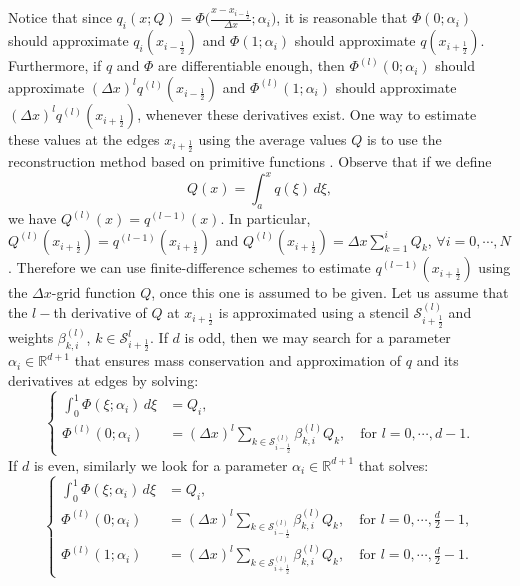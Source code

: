 Notice that since $q_i(x;Q) = \Phi\big(\frac{x-x_{i-\frac{1}{2}}}{\Delta x};\alpha_i\big)$, 
it is reasonable that $\Phi(0;\alpha_i)$ should approximate $q_i(x_{i-\frac{1}{2}})$ and $\Phi(1;\alpha_i)$ should approximate $q(x_{i+\frac{1}{2}})$.
Furthermore, if $q$ and $\Phi$ are differentiable enough, then 
$\Phi^{(l)}(0;\alpha_i)$ should approximate $(\Delta x)^l q^{(l)}(x_{i-\frac{1}{2}})$ and $\Phi^{(l)}(1;\alpha_i)$ should approximate
$(\Delta x)^l q^{(l)}(x_{i+\frac{1}{2}})$, whenever these derivatives exist.
One way to estimate these values at the edges $x_{i+\frac{1}{2}}$ using the average values $Q$ is to use the reconstruction method
based on primitive functions \citep[Chapter~17]{leveque:2002}.
Observe that if we define 
\begin{equation}
\label{chp2-sec-recon-ppm-eq5}
Q(x) = \int_{a}^x q(\xi) \,d\xi,
\end{equation}
we have $Q^{(l)}(x) = q^{(l-1)}(x)$. In particular, $Q^{(l)}(x_{i+\frac{1}{2}}) = q^{(l-1)}(x_{i+\frac{1}{2}})$ and
$Q^{(l)}(x_{i+\frac{1}{2}}) = \Delta x\sum_{k=1}^i Q_k$, $\forall i=0, \cdots, N$.
Therefore we can use finite-difference schemes to estimate $q^{(l-1)}(x_{i+\frac{1}{2}})$
using the $\Delta x$-grid function $Q$, once this one is assumed to be given.
Let us assume that the $l-$th derivative of $Q$ at $x_{i+\frac{1}{2}}$ is approximated using
a stencil $\mathcal{S}^{(l)}_{i+\frac{1}{2}}$ and weights $\beta^{(l)}_{k,i}$, $k \in \mathcal{S}^l_{i+\frac{1}{2}}$.
If $d$ is odd, then we may search for a parameter $\alpha_i \in \mathbb{R}^{d+1}$ that ensures mass conservation and approximation of 
$q$ and its derivatives at edges by solving:
\begin{equation}
	\label{chp2-recon-sys1}
	\begin{cases}
		\int_{0}^{1} \Phi(\xi;\alpha_i) \,d\xi &= {Q}_i,\\
		\Phi^{(l)}(0;\alpha_i) &= (\Delta x)^l \sum_{k \in \mathcal{S}^{(l)}_{i-\frac{1}{2}}} \beta_{k,i}^{(l)} {Q}_k, \quad \text{for } l = 0, \cdots, d-1.
	\end{cases}
\end{equation}
If $d$ is even, similarly we look for a parameter $\alpha_i \in \mathbb{R}^{d+1}$ that solves:
\begin{equation}
	\begin{cases}
		\label{chp2-recon-sys2}
		\int_{0}^{1} \Phi(\xi;\alpha_i) \,d\xi &= {Q}_i,\\
		\Phi^{(l)}(0;\alpha_i) &= (\Delta x)^l \sum_{k \in \mathcal{S}^{(l)}_{i-\frac{1}{2}}} \beta_{k,i}^{(l)} {Q}_k, \quad \text{for } l = 0, \cdots, \frac{d}{2}-1,\\
		\Phi^{(l)}(1;\alpha_i) &= (\Delta x)^l \sum_{k \in \mathcal{S}^{(l)}_{i+\frac{1}{2}}} \beta_{k,i}^{(l)} {Q}_k, \quad \text{for } l = 0, \cdots, \frac{d}{2}-1.
	\end{cases}
\end{equation}
